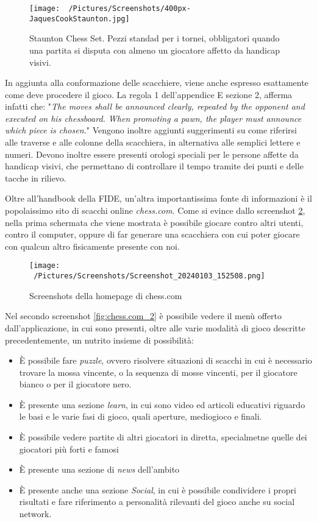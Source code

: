 \documentclass[12pt]{book}
\begin{document}
\begin{figure}[h]
  \caption{Staunton Chess Set. Pezzi standad per i tornei, obbligatori
  quando una partita si disputa con almeno un giocatore affetto da handicap visivi.}
  \centering
  \label{fig:pezzi_staunton}
  \texttt{[image: ~/Pictures/Screenshots/400px-JaquesCookStaunton.jpg]}
\end{figure} 

In aggiunta alla conformazione delle scacchiere, viene anche espresso
esattamente come deve procedere il gioco. La regola 1 dell'appendice E
sezione 2, afferma infatti che: "\textit{The moves shall be announced clearly, repeated by the opponent and executed on his
chessboard. When promoting a pawn, the player must announce which piece is
chosen.}" Vengono inoltre aggiunti suggerimenti su come riferirsi alle
traverse e alle colonne della scacchiera, in alternativa alle semplici
lettere e numeri. Devono inoltre essere presenti orologi speciali per
le persone affette da handicap visivi, che permettano di controllare
il tempo tramite dei punti e delle tacche in rilievo.

Oltre all'handbook della FIDE, un'altra importantissima fonte di
informazioni è il popolaissimo sito di scacchi online
\textit{chess.com}. Come si evince dallo screenshot
\ref{fig:chess.com_1}, nella prima schermata che viene mostrata è
possibile giocare contro altri utenti, contro il computer, oppure di
far generare una scacchiera con cui poter giocare con qualcun altro
fisicamente presente con noi.

\begin{figure}[h]
  \caption{Screenshots della homepage di chess.com}
  \centering
  \label{fig:chess.com_1}
  \texttt{[image: ~/Pictures/Screenshots/Screenshot\_20240103\_152508.png]}
\end{figure} 

Nel secondo screenshot \ref{fig:chess.com_2} è possibile vedere il
menù offerto dall'applicazione, in cui sono presenti, oltre alle varie
modalità di gioco descritte precedentemente, un nutrito insieme di
possibilità:
\begin{itemize}
  \item È possibile fare \textit{puzzle}, ovvero risolvere
    situazioni di scacchi in cui è necessario trovare la mossa
    vincente, o la sequenza di mosse vincenti, per il giocatore bianco
    o per il giocatore nero.
  \item È presente una sezione \textit{learn}, in cui sono video ed
    articoli educativi riguardo le basi e le varie fasi di gioco,
    quali aperture, mediogioco e finali.
  \item È possibile vedere partite di altri giocatori in diretta,
    specialmetne quelle dei giocatori più forti e famosi
  \item È presente una sezione di \textit{news} dell'ambito
  \item È presente anche una sezione \textit{Social}, in cui è
    possibile condividere i propri risultati e fare riferimento a
    personalità rilevanti del gioco anche su social network.
\end{itemize}
\end{document}
